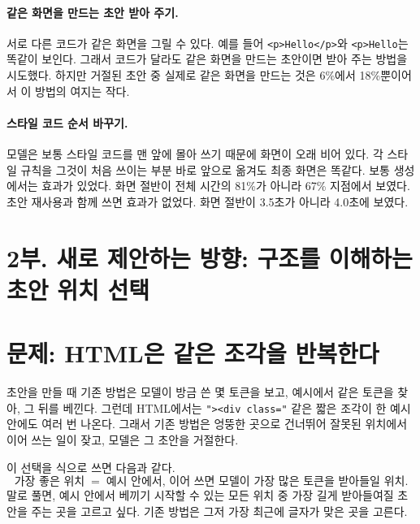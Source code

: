 \documentclass[10pt,a4paper]{article}
\begin{document}
\paragraph{같은 화면을 만드는 초안 받아 주기.} 서로 다른 코드가 같은 화면을 그릴 수 있다. 예를 들어 \texttt{<p>Hello</p>}와 \texttt{<p>Hello}는 똑같이 보인다. 그래서 코드가 달라도 같은 화면을 만드는 초안이면 받아 주는 방법을 시도했다. 하지만 거절된 초안 중 실제로 같은 화면을 만드는 것은 6\%에서 18\%뿐이어서 이 방법의 여지는 작다.

\paragraph{스타일 코드 순서 바꾸기.} 모델은 보통 스타일 코드를 맨 앞에 몰아 쓰기 때문에 화면이 오래 비어 있다. 각 스타일 규칙을 그것이 처음 쓰이는 부분 바로 앞으로 옮겨도 최종 화면은 똑같다. 보통 생성에서는 효과가 있었다. 화면 절반이 전체 시간의 81\%가 아니라 67\% 지점에서 보였다. 초안 재사용과 함께 쓰면 효과가 없었다. 화면 절반이 3.5초가 아니라 4.0초에 보였다.

\section*{2부. 새로 제안하는 방향: 구조를 이해하는 초안 위치 선택}

\section{문제: HTML은 같은 조각을 반복한다}
초안을 만들 때 기존 방법은 모델이 방금 쓴 몇 토큰을 보고, 예시에서 같은 토큰을 찾아, 그 뒤를 베낀다. 그런데 HTML에서는 \texttt{"><div class="} 같은 짧은 조각이 한 예시 안에도 여러 번 나온다. 그래서 기존 방법은 엉뚱한 곳으로 건너뛰어 잘못된 위치에서 이어 쓰는 일이 잦고, 모델은 그 초안을 거절한다.

이 선택을 식으로 쓰면 다음과 같다.
\begin{equation}
\text{가장 좋은 위치} \;=\; \text{예시 안에서, 이어 쓰면 모델이 가장 많은 토큰을 받아들일 위치}.
\end{equation}
말로 풀면, 예시 안에서 베끼기 시작할 수 있는 모든 위치 중 가장 길게 받아들여질 초안을 주는 곳을 고르고 싶다. 기존 방법은 그저 가장 최근에 글자가 맞은 곳을 고른다.
\end{document}

